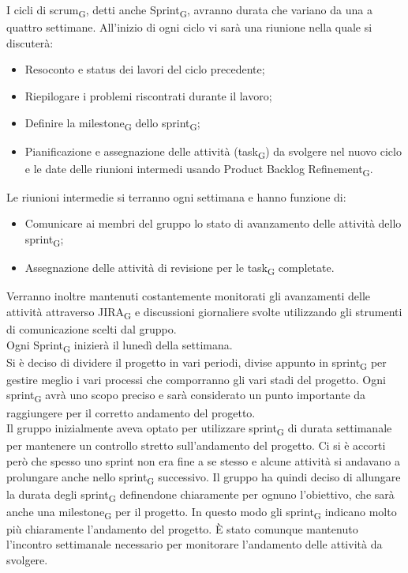 I cicli di scrum\textsubscript{G}, detti anche Sprint\textsubscript{G}, avranno durata che variano da una a quattro settimane. All'inizio di ogni ciclo vi sarà una riunione nella quale si discuterà:
\begin{itemize}
	\item Resoconto e status dei lavori del ciclo precedente;
	\item Riepilogare i problemi riscontrati durante il lavoro;
	\item Definire la milestone\textsubscript{G} dello sprint\textsubscript{G};
	\item Pianificazione e assegnazione delle attività (task\textsubscript{G}) da svolgere nel nuovo ciclo e le date delle riunioni intermedi usando Product Backlog Refinement\textsubscript{G}.
\end{itemize}
Le riunioni intermedie si terranno ogni settimana e hanno funzione di:
\begin{itemize}
	\item Comunicare ai membri del gruppo lo stato di avanzamento delle attività dello sprint\textsubscript{G};
	\item Assegnazione delle attività di revisione per le task\textsubscript{G} completate.
\end{itemize}
Verranno inoltre mantenuti costantemente monitorati gli avanzamenti delle attività attraverso JIRA\textsubscript{G} e discussioni giornaliere svolte utilizzando gli strumenti di comunicazione scelti dal gruppo.\\
Ogni Sprint\textsubscript{G} inizierà il lunedì della settimana.\\
Si è deciso di dividere il progetto in vari periodi, divise appunto in sprint\textsubscript{G} per gestire meglio i vari processi che comporranno gli vari stadi del progetto. Ogni sprint\textsubscript{G} avrà uno scopo preciso e sarà considerato un punto importante da raggiungere per il corretto andamento del progetto.\\
Il gruppo inizialmente aveva optato per utilizzare sprint\textsubscript{G} di durata settimanale per mantenere un controllo stretto sull'andamento del progetto. Ci si è accorti però che spesso uno sprint non era fine a se stesso e alcune attività si andavano a prolungare anche nello sprint\textsubscript{G} successivo. Il gruppo ha quindi deciso di allungare la durata degli sprint\textsubscript{G}  definendone chiaramente per ognuno l'obiettivo, che sarà anche una milestone\textsubscript{G} per il progetto. In questo modo gli sprint\textsubscript{G} indicano molto più chiaramente l'andamento del progetto. È stato comunque mantenuto l'incontro settimanale necessario per monitorare l'andamento delle attività da svolgere.
